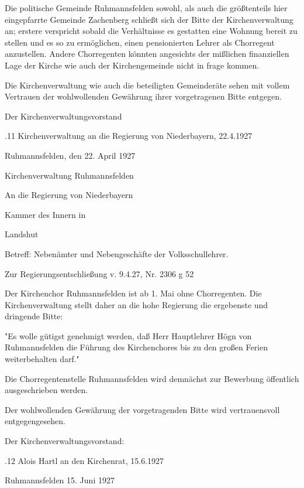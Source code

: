 \documentclass[12pt,a4pager]{book}
\begin{document}
Die politische Gemeinde Ruhmannsfelden sowohl, als auch die größtenteils hier
eingepfarrte Gemeinde Zachenberg schließt sich der Bitte der Kirchenverwaltung
an; erstere verspricht sobald die Verhältnisse es gestatten eine Wohnung bereit
zu stellen und es so zu ermöglichen, einen pensionierten Lehrer als Chorregent
anzustellen. Andere Chorregenten könnten angesichts der mißlichen finanziellen
Lage der Kirche wie auch der Kirchengemeinde nicht in frage kommen.

Die Kirchenverwaltung wie auch die beteiligten Gemeinderäte sehen mit vollem
Vertrauen der wohlwollenden Gewährung ihrer vorgetragenen Bitte entgegen.



Der Kirchenverwaltungsvorstand

.11 Kirchenverwaltung an die Regierung von Niederbayern, 22.4.1927

Ruhmannsfelden, den 22. April 1927

Kirchenverwaltung Ruhmannsfelden



An die Regierung von Niederbayern

Kammer des Innern in

Landshut



Betreff: Nebenämter und Nebengeschäfte der Volksschullehrer.



Zur Regierungsentschließung v. 9.4.27, Nr. 2306 g 52



Der Kirchenchor Ruhmannsfelden ist ab 1. Mai ohne Chorregenten. Die
Kirchenverwaltung stellt daher an die hohe Regierung die ergebenste und
dringende Bitte:

"Es wolle gütigst genehmigt werden, daß Herr Hauptlehrer Högn von Ruhmannsfelden
die Führung des Kirchenchores bis zu den großen Ferien weiterbehalten darf."



Die Chorregentenstelle Ruhmannsfelden wird demnächst zur Bewerbung öffentlich
ausgeschrieben werden.

Der wohlwollenden Gewährung der vorgetragenden Bitte wird vertrauensvoll
entgegengesehen.



Der Kirchenverwaltungsvorstand:

.12 Alois Hartl an den Kirchenrat, 15.6.1927

Ruhmannsfelden 15. Juni 1927
\end{document}
